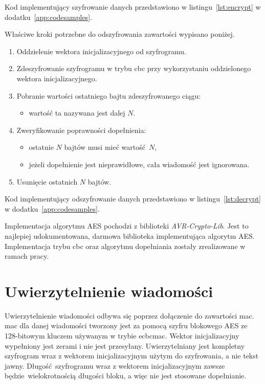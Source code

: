 Kod implementujący szyfrowanie danych przedstawiono w listingu~\ref{lst:encrypt} w dodatku~\ref{app:codesamples}.

Właściwe kroki potrzebne do odszyfrowania zawartości wypisano poniżej.

\begin{enumerate}
\item Oddzielenie wektora inicjalizacyjnego od szyfrogramu.
\item Zdeszyfrowanie szyfrogramu w trybu \gls{cbc} przy wykorzystaniu oddzielonego wektora inicjalizacyjnego.
\item Pobranie wartości ostatniego bajtu zdeszyfrowanego ciągu:
\begin{itemize}
    \item wartość ta nazywana jest dalej $ N $.
\end{itemize}
\item Zweryfikowanie poprawności dopełnienia:
\begin{itemize}
    \item ostatnie $ N $ bajtów musi mieć wartość $ N $,
    \item jeżeli dopełnienie jest nieprawidłowe, cała wiadomość jest ignorowana.
\end{itemize}
\item Usunięcie ostatnich $ N $ bajtów.
\end{enumerate}

Kod implementujący odszyfrowanie danych przedstawiono w listingu~\ref{lst:decrypt} w dodatku~\ref{app:codesamples}.

Implementacja algorytmu AES pochodzi z biblioteki \emph{AVR-Crypto-Lib}. Jest to najlepiej udokumentowana, darmowa biblioteka implementująca algorytm AES. Implementacja trybu \gls{cbc} oraz algorytmu dopełniania zostały zrealizowane w ramach pracy.

\section{Uwierzytelnienie wiadomości}
\label{sec:auth}

Uwierzytelnienie wiadomości odbywa się poprzez dołączenie do zawartości \gls{mac}. \gls{mac} dla danej wiadomości tworzony jest za pomocą szyfru blokowego AES ze 128-bitowym kluczem używanym w trybie \gls{ecbcmac}. Wektor inicjalizacyjny wypełniony jest zerami i nie jest przesyłany. Uwierzytelniany jest kompletny szyfrogram wraz z wektorem inicjalizacyjnym użytym do szyfrowania, a nie tekst jawny. Długość szyfrogramu wraz z wektorem inicjalizacyjnym zawsze będzie wielokrotnością długości bloku, a więc nie jest stosowane dopełnianie.

